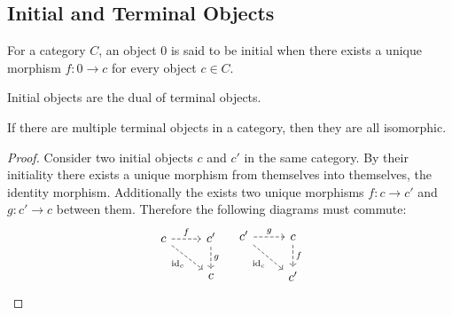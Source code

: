 \subsection{Initial and Terminal Objects}

\begin{definition}
  For a category $C$, an object $0$ is said to be initial when there exists a
  unique morphism $f: 0\to c$ for every object $c\in C$.
  \parencite{awodey:category_theory}
\end{definition}

\begin{remark}
  Initial objects are the dual of terminal objects.
\end{remark}

\begin{theorem}\label{thm:initial_object_iso} If
  there are multiple terminal objects in a category, then they are all
  isomorphic.

  \begin{proof}
    Consider two initial objects $c$ and $c'$ in the same category. By their
    initiality there exists a unique morphism from themselves into themselves,
    the identity morphism. Additionally the exists two unique morphisms $f:c\to
    c'$ and $g:c' \to c$ between them. Therefore the following diagrams must
    commute:
    \[\begin{tikzcd}
      c & {c'} \\
      & c
      \arrow["{\id_c}"', dashed, from=1-1, to=2-2]
      \arrow["f", dashed, from=1-1, to=1-2]
      \arrow["g", dashed, from=1-2, to=2-2]
    \end{tikzcd}
    \quad
    \begin{tikzcd}
      {c'} & c \\
      & {c'}
      \arrow["{\id_c}"', dashed, from=1-1, to=2-2]
      \arrow["g", dashed, from=1-1, to=1-2]
      \arrow["f", dashed, from=1-2, to=2-2]
    \end{tikzcd}\]
  \end{proof}
\end{theorem}


